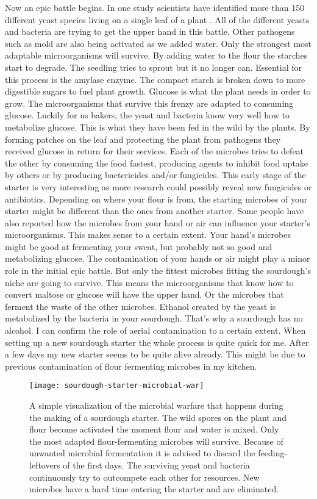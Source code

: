 Now an epic battle begins. In one study scientists
have identified more than 150 different yeast species living
on a single leaf of a plant \cite{yeasts+biocontrol+agent}.
All of the different yeasts and bacteria are trying to get
the upper hand in this battle. Other pathogens such as mold
are also being activated as we added water. Only the strongest
most adaptable microorganisms will survive. By adding water to the
flour the starches start to degrade. The seedling tries to
sprout but it no longer can. Essential for this process is the
amylase enzyme. The compact starch is broken down to more
digestible sugars to fuel plant growth. Glucose is what the
plant needs in order to grow. The microorganisms that survive
this frenzy are adapted to consuming glucose. Luckily for us
bakers, the yeast and bacteria know very well how to metabolize
glucose. This is what they have been fed in the wild by the plants.
By forming patches on the leaf and protecting the plant from
pathogens they received glucose in return for their services.
Each of the microbes tries to defeat the other by consuming the
food fastest, producing agents to inhibit food uptake by others or by producing
bactericides and/or fungicides. This early stage of the starter
is very interesting as more research could possibly reveal
new fungicides or antibiotics. Depending on where your flour
is from, the starting microbes of your starter might be different
than the ones from another starter. Some people have also reported
how the microbes from your hand or air can influence your starter's
microorganisms. This makes sense to a certain extent. Your
hand's microbes might be good at fermenting your sweat, but
probably not so good and metabolizing glucose. The contamination
of your hands or air might play a minor role in the initial epic
battle. But only the fittest microbes fitting the sourdough's
niche are going to survive. This means the microorganisms that know
how to convert maltose or glucose will have the upper hand. Or the
microbes that ferment the waste of the other microbes. Ethanol created
by the yeast is metabolized by the bacteria in your sourdough. That's
why a sourdough has no alcohol. I can confirm the role of aerial
contamination to a certain extent. When setting up a new sourdough
starter the whole process is quite quick for me. After a few
days my new starter seems to be quite alive already. This might
be due to previous contamination of flour fermenting microbes in
my kitchen.

\begin{figure}[!htb]
  \texttt{[image: sourdough-starter-microbial-war]}
  \caption{A simple visualization of the microbial warfare that happens during the making of a sourdough starter. The
  wild spores on the plant and flour become activated the moment flour and water is mixed.
  Only the most adapted flour-fermenting microbes will survive. Because of unwanted microbial fermentation it is advised
  to discard the feeding-leftovers of the first days. The surviving yeast and bacteria continuously try to
  outcompete each other for resources. New microbes have a hard time entering the starter and are eliminated.
  }
  \label{fig:sourdough-starter-microbial-war}
\end{figure}


